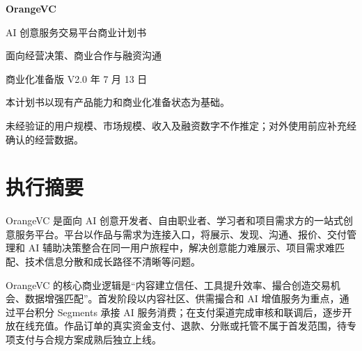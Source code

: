 \documentclass[12pt,a4paper,openany,fontset=fandol]{ctexrep}
\begin{document}
\begin{titlepage}
  \centering
  \vspace*{2.5cm}
  {\Huge\bfseries\color{MainOrange} OrangeVC\par}
  \vspace{0.6cm}
  {\LARGE AI 创意服务交易平台商业计划书\par}
  \vspace{1.2cm}
  {\large 面向经营决策、商业合作与融资沟通\par}
  \vspace{0.5cm}
  {\large 商业化准备版 V2.0 年 7 月 13 日\par}
  \vfill
  \vfill
  {\small 本计划书以现有产品能力和商业化准备状态为基础。\par
  未经验证的用户规模、市场规模、收入及融资数字不作推定；对外使用前应补充经确认的经营数据。}
\end{titlepage}

\tableofcontents
\clearpage

\chapter{执行摘要}

OrangeVC 是面向 AI 创意开发者、自由职业者、学习者和项目需求方的一站式创意服务平台。平台以作品与需求为连接入口，将展示、发现、沟通、报价、交付管理和 AI 辅助决策整合在同一用户旅程中，解决创意能力难展示、项目需求难匹配、技术信息分散和成长路径不清晰等问题。

OrangeVC 的核心商业逻辑是“内容建立信任、工具提升效率、撮合创造交易机会、数据增强匹配”。首发阶段以内容社区、供需撮合和 AI 增值服务为重点，通过平台积分 Segments 承接 AI 服务消费；在支付渠道完成审核和联调后，逐步开放在线充值。作品订单的真实资金支付、退款、分账或托管不属于首发范围，待专项支付与合规方案成熟后独立上线。
\end{document}
